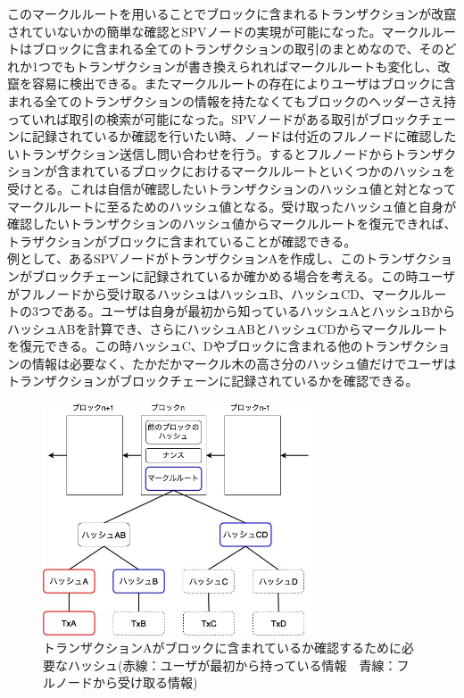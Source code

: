 \documentclass[12pt]{jarticle}
\begin{document}
このマークルルートを用いることでブロックに含まれるトランザクションが改竄されていないかの簡単な確認とSPVノードの実現が可能になった。マークルルートはブロックに含まれる全てのトランザクションの取引のまとめなので、そのどれか1つでもトランザクションが書き換えられればマークルルートも変化し、改竄を容易に検出できる。またマークルルートの存在によりユーザはブロックに含まれる全てのトランザクションの情報を持たなくてもブロックのヘッダーさえ持っていれば取引の検索が可能になった。SPVノードがある取引がブロックチェーンに記録されているか確認を行いたい時、ノードは付近のフルノードに確認したいトランザクション送信し問い合わせを行う。するとフルノードからトランザクションが含まれているブロックにおけるマークルルートといくつかのハッシュを受けとる。これは自信が確認したいトランザクションのハッシュ値と対となってマークルルートに至るためのハッシュ値となる。受け取ったハッシュ値と自身が確認したいトランザクションのハッシュ値からマークルルートを復元できれば、トラザクションがブロックに含まれていることが確認できる。\\
例として、あるSPVノードがトランザクションAを作成し、このトランザクションがブロックチェーンに記録されているか確かめる場合を考える。この時ユーザがフルノードから受け取るハッシュはハッシュB、ハッシュCD、マークルルートの3つである。ユーザは自身が最初から知っているハッシュAとハッシュBからハッシュABを計算でき、さらにハッシュABとハッシュCDからマークルルートを復元できる。この時ハッシュC、Dやブロックに含まれる他のトランザクションの情報は必要なく、たかだかマークル木の高さ分のハッシュ値だけでユーザはトランザクションがブロックチェーンに記録されているかを確認できる。

\begin{figure}[h]
 \centering
   \includegraphics[width=80mm]{figures/marklepath.jpg}
 \caption{トランザクションAがブロックに含まれているか確認するために必要なハッシュ(赤線：ユーザが最初から持っている情報　青線：フルノードから受け取る情報)}
 \label{path}
\end{figure}
\end{document}
